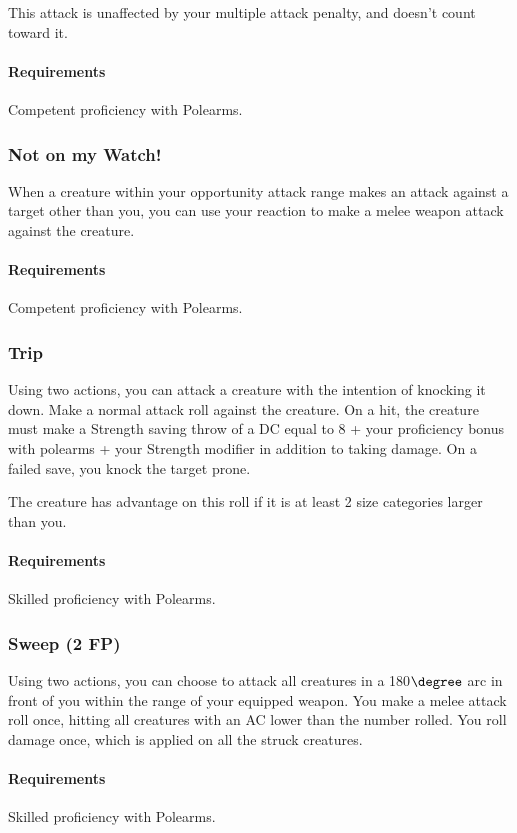     This attack is unaffected by your multiple attack penalty, and doesn't count toward it.
    \paragraph{Requirements} Competent proficiency with Polearms.
\subsubsection{Not on my Watch!} \label{feat::notonmywatch}
    When a creature within your opportunity attack range makes an attack against a target other than you, you can use your reaction to make a melee weapon attack against the creature.
    \paragraph{Requirements} Competent proficiency with Polearms.
\subsubsection{Trip} \label{feat::trip}
    Using two actions, you can attack a creature with the intention of knocking it down.
    Make a normal attack roll against the creature.
    On a hit, the creature must make a Strength saving throw of a DC equal to 8 + your proficiency bonus with polearms + your Strength modifier in addition to taking damage.
    On a failed save, you knock the target prone.

    The creature has advantage on this roll if it is at least 2 size categories larger than you.
    \paragraph{Requirements} Skilled proficiency with Polearms.
\subsubsection{Sweep (2 FP)} \label{feat::sweep}
    Using two actions, you can choose to attack all creatures in a 180$\degree$ arc in front of you within the range of your equipped weapon.
    You make a melee attack roll once, hitting all creatures with an AC lower than the number rolled.
    You roll damage once, which is applied on all the struck creatures.
    \paragraph{Requirements} Skilled proficiency with Polearms.
